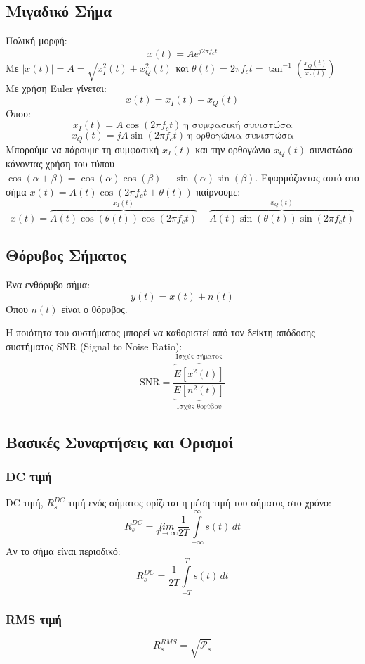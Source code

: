 \documentclass[a4paper,12pt]{article}
\begin{document}
\subsection*{Μιγαδικό Σήμα}
Πολική μορφή:
\[
x(t) = Ae^{j 2\pi f_{c}t}
\]
Με \(|x(t)|=A=\sqrt{ x_{I}^2(t)+x_{Q}^2(t) }\) και \(\theta(t)=2 \pi f_{c}t=\tan^{-1}\left( \frac{x_{Q}(t)}{x_{I}(t)} \right)\)\\
Με χρήση Euler γίνεται:
\[
x(t) = x_{I}(t)+x_{Q}(t)
\]
Όπου:
\[
x_{I}(t)=A\cos(2 \pi f_{c}t) \ \text{η συμφασική συνιστώσα}
\]
\[
x_{Q}(t)=jA\sin(2 \pi f_{c}t) \ \text{η ορθογώνια συνιστώσα}
\]
Μπορούμε να πάρουμε τη συμφασική \(x_I(t)\) και την ορθογώνια \(x_Q(t)\) συνιστώσα κάνοντας χρήση του τύπου \(\cos(\alpha + \beta)=\cos(\alpha)\cos(\beta)-\sin(\alpha)\sin(\beta)\). Εφαρμόζοντας αυτό στο σήμα \(x(t)=A(t)\cos(2 \pi f_c t + \theta(t))\) παίρνουμε:
\[
x(t)=\overbrace{A(t)\cos(\theta(t))\cos(2 \pi f_c t)}^{x_I(t)}-\overbrace{A(t)\sin(\theta(t))\sin(2 \pi f_c t)}^{x_Q(t)}
\]

\subsection*{Θόρυβος Σήματος}
Ένα ενθόρυβο σήμα:
\[
y(t)=x(t)+n(t)
\]
Όπου \(n(t)\) είναι ο θόρυβος.

Η ποιότητα του συστήματος μπορεί να καθοριστεί από τον δείκτη απόδοσης συστήματος SNR (Signal to Noise Ratio):
\[
\text{SNR}= \frac{\overbrace{E[x^2(t)]}^{\text{Ισχύς σήματος}}}{\underbrace{E[n^2(t)]}_{\text{Ισχύς θορύβου}} }
\]

\subsection*{Βασικές Συναρτήσεις και Ορισμοί}

\subsubsection*{DC τιμή}
DC τιμή, \(R_s^{DC}\) τιμή ενός σήματος ορίζεται η μέση τιμή του σήματος στο χρόνο:
\[
R_s^{DC}=\underset{T \to \infty}{lim} \frac{1}{2T} \int\limits^{\infty}_{-\infty} s(t) \, dt
\]
Αν το σήμα είναι περιοδικό:
\[
R_s^{DC} = \frac{1}{2T}\int\limits^{T}_{-T} s(t) \, dt
\]

\subsubsection*{RMS τιμή}
\[
R_s^{RMS}=\sqrt{\mathcal{P}_s}
\]
\end{document}
